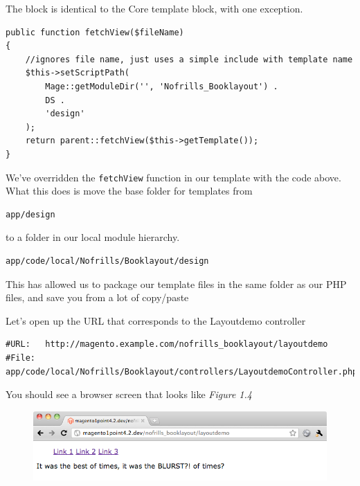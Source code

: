 \documentclass[oneside]{book}
\begin{document}
The block is identical to the Core template block, with one exception.  

\begin{lstlisting}
public function fetchView($fileName)                
{           
    //ignores file name, just uses a simple include with template name
    $this->setScriptPath(
        Mage::getModuleDir('', 'Nofrills_Booklayout') . 
        DS . 
        'design'
    );          
    return parent::fetchView($this->getTemplate());
}

\end{lstlisting}


We've overridden the \footnotesize\texttt{fetchView} \normalsize  function in our template with the code above.  What this does is move the base folder for templates from 

\begin{lstlisting}
app/design

\end{lstlisting}


to a folder in our local module hierarchy.

\begin{lstlisting}
app/code/local/Nofrills/Booklayout/design

\end{lstlisting}


This has allowed us to package our template files in the same folder as our PHP files, and save you from a lot of copy/paste

Let's open up the URL that corresponds to the Layoutdemo controller 

\begin{lstlisting}
#URL:   http://magento.example.com/nofrills_booklayout/layoutdemo
#File:  app/code/local/Nofrills/Booklayout/controllers/LayoutdemoController.php

\end{lstlisting}


You should see a browser screen that looks like \emph{Figure 1.4}

\begin{figure}[htb]
\begin{center}
\leavevmode
\includegraphics[width=1\textwidth]{images/chapter1/twocities.png}
\end{center}
\caption{}
\end{figure}
 
\end{document}

